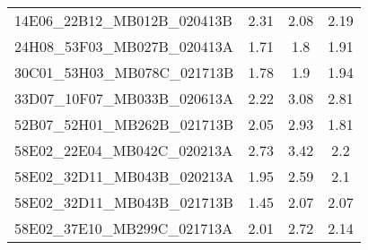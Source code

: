 \begin{adjustbox}{width=\textwidth}
\begin{tabular}{|l|ccc|}
	14E06\_22B12\_MB012B\_020413B                              & \multicolumn{1}{c|}{2.31}               & \multicolumn{1}{c|}{2.08}                                                                    & 2.19                                                                             \\
	24H08\_53F03\_MB027B\_020413A                              & \multicolumn{1}{c|}{1.71}               & \multicolumn{1}{c|}{1.8}                                                                     & 1.91                                                                             \\
	30C01\_53H03\_MB078C\_021713B                              & \multicolumn{1}{c|}{1.78}               & \multicolumn{1}{c|}{1.9}                                                                     & 1.94                                                                             \\
	33D07\_10F07\_MB033B\_020613A                              & \multicolumn{1}{c|}{2.22}               & \multicolumn{1}{c|}{3.08}                                                                    & 2.81                                                                             \\
	52B07\_52H01\_MB262B\_021713B                              & \multicolumn{1}{c|}{2.05}               & \multicolumn{1}{c|}{2.93}                                                                    & 1.81                                                                             \\
	58E02\_22E04\_MB042C\_020213A                              & \multicolumn{1}{c|}{2.73}               & \multicolumn{1}{c|}{3.42}                                                                    & 2.2                                                                              \\
	58E02\_32D11\_MB043B\_020213A                              & \multicolumn{1}{c|}{1.95}               & \multicolumn{1}{c|}{2.59}                                                                    & 2.1                                                                              \\
	58E02\_32D11\_MB043B\_021713B                              & \multicolumn{1}{c|}{1.45}               & \multicolumn{1}{c|}{2.07}                                                                    & 2.07                                                                             \\
	58E02\_37E10\_MB299C\_021713A                              & \multicolumn{1}{c|}{2.01}               & \multicolumn{1}{c|}{2.72}                                                                    & 2.14                                                                             \\

\end{tabular}
\end{adjustbox}
